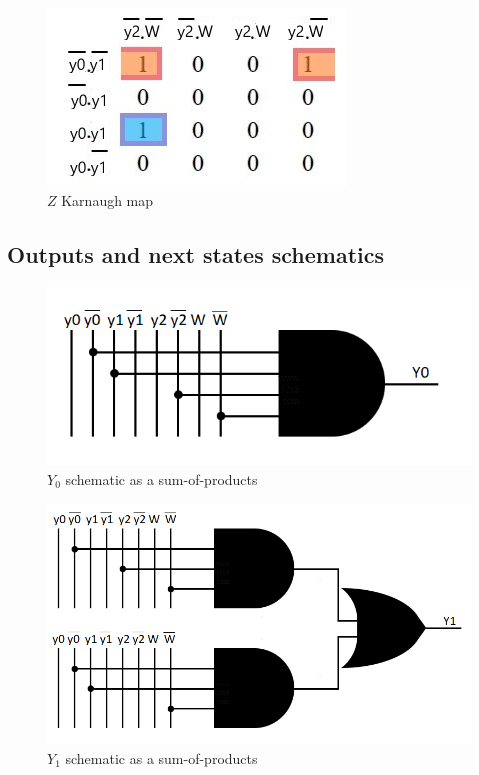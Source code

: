 \documentclass[../../e3_tp3_main.tex]{subfiles}
\begin{document}
\begin{figure}[H]
	\centering
	\includegraphics[scale=1]{figures/e3_tp3_ej2_moore_z_kmap.jpg}
	\caption{$Z$ Karnaugh map}
\end{figure}


\subsection{Outputs and next states schematics}
\begin{figure}[H]
	\centering
	\includegraphics{figures/ej2_Y0_schem.PNG}
	\caption{$Y_0$ schematic as a sum-of-products}
\end{figure}
\begin{figure}[H]
	\centering
	\includegraphics{figures/ej2_Y1_schem.PNG}
	\caption{$Y_1$ schematic as a sum-of-products}
\end{figure}
\end{document}
